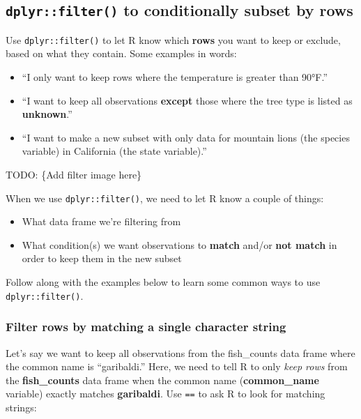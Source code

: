 \documentclass[]{book}
\providecommand{\tightlist}{%
  \setlength{\itemsep}{0pt}\setlength{\parskip}{0pt}}
\begin{document}
\hypertarget{dplyrfilter-to-conditionally-subset-by-rows}{%
\subsection{\texorpdfstring{\texttt{dplyr::filter()} to conditionally subset by rows}{dplyr::filter() to conditionally subset by rows}}\label{dplyrfilter-to-conditionally-subset-by-rows}}

Use \texttt{dplyr::filter()} to let R know which \textbf{rows} you want to keep or exclude, based on what they contain. Some examples in words:

\begin{itemize}
\tightlist
\item
  ``I only want to keep rows where the temperature is greater than 90°F.''
\item
  ``I want to keep all observations \textbf{except} those where the tree type is listed as \textbf{unknown}.''
\item
  ``I want to make a new subset with only data for mountain lions (the species variable) in California (the state variable).''
\end{itemize}

TODO: \{Add filter image here\}

When we use \texttt{dplyr::filter()}, we need to let R know a couple of things:

\begin{itemize}
\tightlist
\item
  What data frame we're filtering from
\item
  What condition(s) we want observations to \textbf{match} and/or \textbf{not match} in order to keep them in the new subset
\end{itemize}

Follow along with the examples below to learn some common ways to use \texttt{dplyr::filter()}.

\hypertarget{filter-rows-by-matching-a-single-character-string}{%
\subsubsection{Filter rows by matching a single character string}\label{filter-rows-by-matching-a-single-character-string}}

Let's say we want to keep all observations from the fish\_counts data frame where the common name is ``garibaldi.'' Here, we need to tell R to only \emph{keep rows} from the \textbf{fish\_counts} data frame when the common name (\textbf{common\_name} variable) exactly matches \textbf{garibaldi}.
Use \texttt{==} to ask R to look for matching strings:
\end{document}
